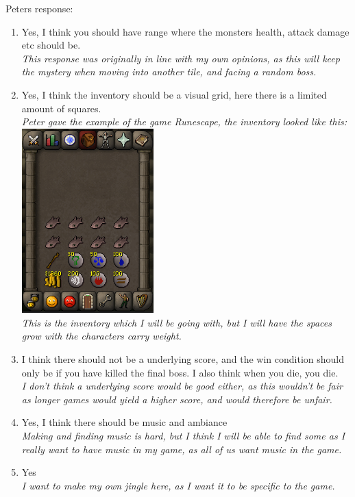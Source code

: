 \documentclass[12pt]{article}
\begin{document}
\centerline{Peters response:}

\begin{enumerate}
	\item{Yes, I think you should have range where the monsters health, attack damage etc should be. \\}
	\em{This response was originally in line with my own opinions, as this will keep the mystery when moving into another tile, and facing a random boss.}
	
	\item{Yes, I think the inventory should be a visual grid, here there is a limited amount of squares. \\}
	\em{Peter gave the example of the game Runescape, the inventory looked like this:\\}
	\includegraphics[width = 0.4\textwidth]{RuneScape_Image}
	\\
	\em{This is the inventory which I will be going with, but I will have the spaces grow with the characters carry weight.}
	
	\item{I think there should not be a underlying score, and the win condition should only be if you have killed the final boss. I also think when you die, you die.\\}
	\em{I don't think a underlying score would be good either, as this wouldn't be fair as longer games would yield a higher score, and would therefore be unfair.}
	
	\item{Yes, I think there should be music and ambiance\\}	
	\em{Making and finding music is hard, but I think I will be able to find some as I really want to have music in my game, as all of us want music in the game.}
	
	\item{Yes\\}
	\em{I want to make my own jingle here, as I want it to be specific to the game.}
	

\end{enumerate}
\end{document}
